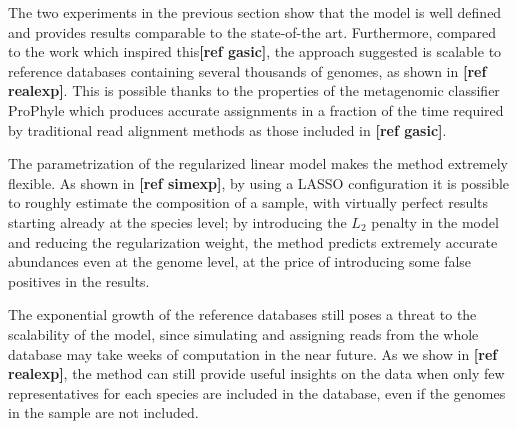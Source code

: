 The two experiments in the previous section show that the model is well defined and provides results comparable to the state-of-the art. Furthermore, compared to the work which inspired this\textbf{[ref gasic]}, the approach suggested is scalable to reference databases containing several thousands of genomes, as shown in \textbf{[ref realexp]}. This is possible thanks to the properties of the metagenomic classifier ProPhyle which produces accurate assignments in a fraction of the time required by traditional read alignment methods as those included in \textbf{[ref gasic]}.

The parametrization of the regularized linear model makes the method extremely flexible. As shown in \textbf{[ref simexp]}, by using a LASSO configuration it is possible to roughly estimate the composition of a sample, with virtually perfect results starting already at the species level; by introducing the $L_2$ penalty in the model and reducing the regularization weight, the method predicts extremely accurate abundances even at the genome level, at the price of introducing some false positives in the results.

The exponential growth of the reference databases still poses a threat to the scalability of the model, since simulating and assigning reads from the whole database may take weeks of computation in the near future. As we show in \textbf{[ref realexp]}, the method can still provide useful insights on the data when only few representatives for each species are included in the database, even if the genomes in the sample are not included.
